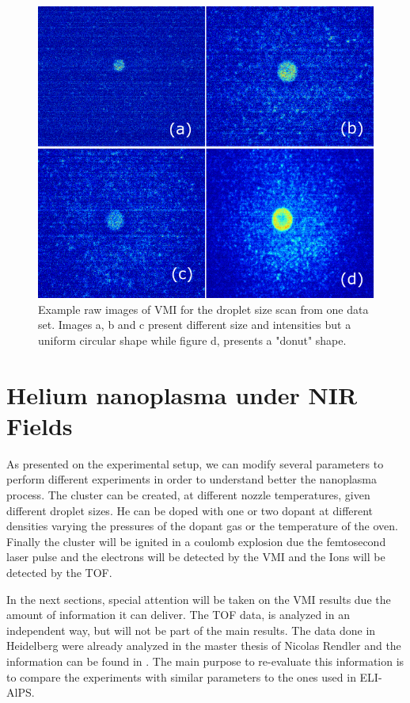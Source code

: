 \begin{figure}[h!]
\centering
\includegraphics[width =12 cm]{../Images/results/Mir_He_Dropletsize/rawimageSample.png}
\caption[He-Xe dop, raw image]{Example raw images of VMI for the droplet size scan from one data set. Images a, b and c present different size and intensities but a uniform circular shape while figure d, presents a "donut" shape.}
\label{fig:rawMIRHESIZE}
\end{figure}

\section{Helium nanoplasma under NIR Fields}

As presented on the experimental setup, we can modify several parameters to perform different experiments in order to understand better the nanoplasma process. The cluster can be created, at different nozzle temperatures, given different droplet sizes. He can be doped with one or two dopant at different densities varying the pressures of the dopant gas or the temperature of the oven. Finally the cluster will be ignited in a coulomb explosion due the femtosecond laser pulse and the electrons will be detected by the VMI and the Ions will be detected by the TOF. 

In the next sections, special attention will be taken on the VMI results due the amount of information it can deliver. The TOF data, is analyzed in an independent way, but will not be part of the main results. The data done in Heidelberg were already analyzed in the master thesis of Nicolas Rendler and the information can be found in \cite{rendler_einzelschuss_2017}. The main purpose to re-evaluate this information is to compare the experiments with similar parameters to the ones used in ELI-AlPS.

